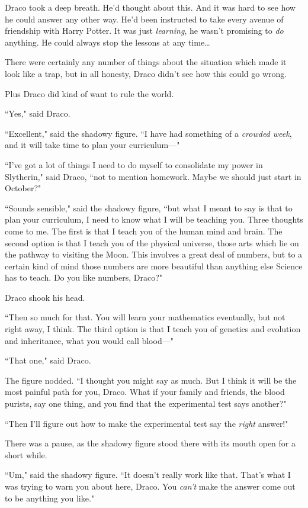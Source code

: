 Draco took a deep breath. He'd thought about this. And it was hard to see how he could answer any other way. He'd been instructed to take every avenue of friendship with Harry Potter. It was just \emph{learning}, he wasn't promising to \emph{do} anything. He could always stop the lessons at any time{\ldots}

There were certainly any number of things about the situation which made it look like a trap, but in all honesty, Draco didn't see how this could go wrong.

Plus Draco did kind of want to rule the world.

``Yes," said Draco.

``Excellent," said the shadowy figure. ``I have had something of a \emph{crowded week}, and it will take time to plan your curriculum—"

``I've got a lot of things I need to do myself to consolidate my power in Slytherin," said Draco, ``not to mention homework. Maybe we should just start in October?"

``Sounds sensible," said the shadowy figure, ``but what I meant to say is that to plan your curriculum, I need to know what I will be teaching you. Three thoughts come to me. The first is that I teach you of the human mind and brain. The second option is that I teach you of the physical universe, those arts which lie on the pathway to visiting the Moon. This involves a great deal of numbers, but to a certain kind of mind those numbers are more beautiful than anything else Science has to teach. Do you like numbers, Draco?"

Draco shook his head.

``Then so much for that. You will learn your mathematics eventually, but not right away, I think. The third option is that I teach you of genetics and evolution and inheritance, what you would call blood—"

``That one," said Draco.

The figure nodded. ``I thought you might say as much. But I think it will be the most painful path for you, Draco. What if your family and friends, the blood purists, say one thing, and you find that the experimental test says another?"

``Then I'll figure out how to make the experimental test say the \emph{right} answer!"

There was a pause, as the shadowy figure stood there with its mouth open for a short while.

``Um," said the shadowy figure. ``It doesn't really work like that. That's what I was trying to warn you about here, Draco. You \emph{can't} make the answer come out to be anything you like."


